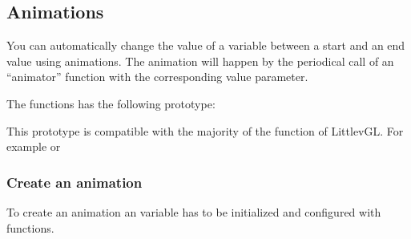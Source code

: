 \documentclass[letterpaper,10pt,english]{sphinxmanual}
\begin{document}
\subsection{Animations}
\label{\detokenize{overview/animations:animations}}\label{\detokenize{overview/animations::doc}}
You can automatically change the value of a variable between a start and an end value using animations.
The animation will happen by the periodical call of an “animator” function with the corresponding value parameter.

The  functions has the following prototype:

\begin{sphinxVerbatim}[commandchars=\\\{\}]
     
\end{sphinxVerbatim}

This prototype is compatible with the majority of the  function of LittlevGL. For example  or 


\subsubsection{Create an animation}
\label{\detokenize{overview/animations:create-an-animation}}
To create an animation an  variable has to be initialized and configured with  functions.
\end{document}
